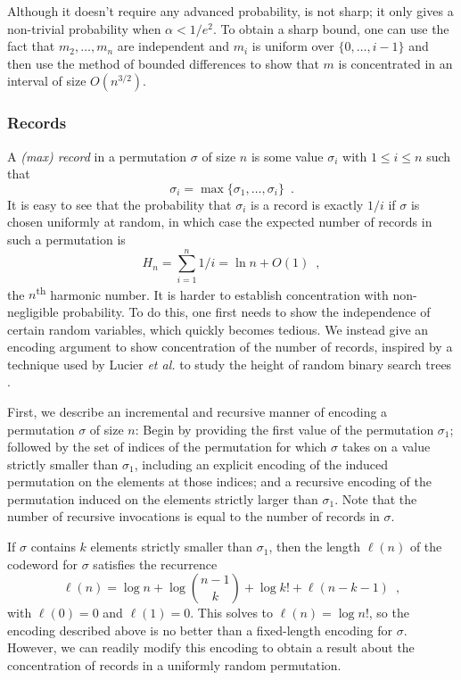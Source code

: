 \documentclass{patmorin}
\begin{document}
\begin{rem}
  Although it doesn't require any advanced probability,
   is not sharp; it only gives a non-trivial
  probability when $\alpha < 1/e^2$.  To obtain a sharp bound, one can
  use the fact that $m_2,\ldots,m_n$ are independent and $m_i$ is
  uniform over $\{0,\ldots,i-1\}$ and then use the method of bounded
  differences \cite{mcdiarmid:on} to show that $m$ is concentrated in
  an interval of size $O(n^{3/2})$.
\end{rem}

\subsubsection{Records}

A \emph{(max) record} in a permutation $\sigma$ of size $n$ is some
value $\sigma_i$ with $1 \leq i \leq n$ such that
\[
  \sigma_i = \max\{\sigma_1, \dots, \sigma_i\} \enspace .
\]
It is easy to see that the probability that $\sigma_i$ is a record is
exactly $1/i$ if $\sigma$ is chosen uniformly at random, in which case
the expected number of records in such a permutation is
\[
  H_n = \sum_{i = 1}^n 1/i = \ln n + O(1) \enspace ,
\]
the $n$\textsuperscript{th} harmonic number. It is harder to establish
concentration with non-negligible probability. To do this, one first
needs to show the independence of certain random variables, which
quickly becomes tedious. We instead give an encoding argument to show
concentration of the number of records, inspired by a technique used
by Lucier \emph{et al.} to study the height of random binary search
trees \cite{lucier.jiang.li:quicksort}.

First, we describe an incremental and recursive manner of encoding a
permutation $\sigma$ of size $n$: Begin by providing the first value
of the permutation $\sigma_1$; followed by the set of indices of the
permutation for which $\sigma$ takes on a value strictly smaller than
$\sigma_1$, including an explicit encoding of the induced permutation
on the elements at those indices; and a recursive encoding of the
permutation induced on the elements strictly larger than $\sigma_1$.
Note that the number of recursive invocations is equal to the
number of records in $\sigma$.

If $\sigma$ contains $k$ elements strictly smaller than $\sigma_1$,
then the length $\ell(n)$ of the codeword for $\sigma$ satisfies the
recurrence
\[
  \ell(n) = \log n + \log \binom{n - 1}{k} + \log k! + \ell(n - k - 1) \enspace ,
\]
with $\ell(0) = 0$ and $\ell(1) = 0$. This solves to $\ell(n) = \log
n!$, so the encoding described above is no better than a fixed-length
encoding for $\sigma$. However, we can readily modify this encoding to
obtain a result about the concentration of records in a uniformly
random permutation.
\end{document}
